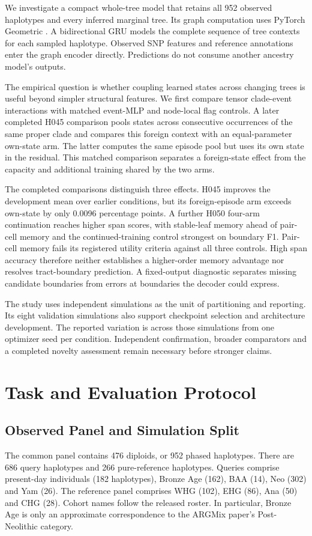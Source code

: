 \documentclass[letterpaper]{article}
\begin{document}
We investigate a compact whole-tree model that retains all 952 observed haplotypes and every inferred marginal tree. Its graph computation uses PyTorch Geometric \citep{pyg2019}. A bidirectional GRU \citep{gru2014} models the complete sequence of tree contexts for each sampled haplotype. Observed SNP features and reference annotations enter the graph encoder directly. Predictions do not consume another ancestry model's outputs.

The empirical question is whether coupling learned states across changing trees is useful beyond simpler structural features. We first compare tensor clade-event interactions with matched event-MLP and node-local flag controls. A later completed H045 comparison pools states across consecutive occurrences of the same proper clade and compares this foreign context with an equal-parameter own-state arm. The latter computes the same episode pool but uses its own state in the residual. This matched comparison separates a foreign-state effect from the capacity and additional training shared by the two arms.

The completed comparisons distinguish three effects. H045 improves the development mean over earlier conditions, but its foreign-episode arm exceeds own-state by only 0.0096 percentage points. A further H050 four-arm continuation reaches higher span scores, with stable-leaf memory ahead of pair-cell memory and the continued-training control strongest on boundary F1. Pair-cell memory fails its registered utility criteria against all three controls. High span accuracy therefore neither establishes a higher-order memory advantage nor resolves tract-boundary prediction. A fixed-output diagnostic separates missing candidate boundaries from errors at boundaries the decoder could express.

The study uses independent simulations as the unit of partitioning and reporting. Its eight validation simulations also support checkpoint selection and architecture development. The reported variation is across those simulations from one optimizer seed per condition. Independent confirmation, broader comparators and a completed novelty assessment remain necessary before stronger claims.

\section{Task and Evaluation Protocol}
\subsection{Observed Panel and Simulation Split}
The common panel contains 476 diploids, or 952 phased haplotypes. There are 686 query haplotypes and 266 pure-reference haplotypes. Queries comprise present-day individuals (182 haplotypes), Bronze Age (162), BAA (14), Neo (302) and Yam (26). The reference panel comprises WHG (102), EHG (86), Ana (50) and CHG (28). Cohort names follow the released roster. In particular, Bronze Age is only an approximate correspondence to the ARGMix paper's Post-Neolithic category.
\end{document}
